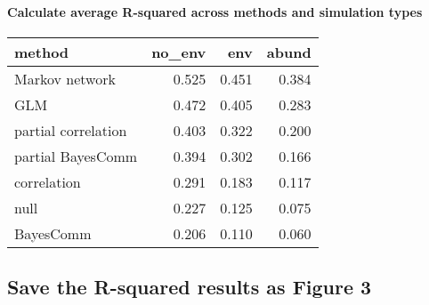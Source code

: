 \documentclass[11pt,]{article}
\newenvironment{Shaded}{\begin{snugshade}}{\end{snugshade}}
\newcommand{\KeywordTok}[1]{\textcolor[rgb]{0.13,0.29,0.53}{\textbf{{#1}}}}
\newcommand{\DataTypeTok}[1]{\textcolor[rgb]{0.13,0.29,0.53}{{#1}}}
\newcommand{\DecValTok}[1]{\textcolor[rgb]{0.00,0.00,0.81}{{#1}}}
\newcommand{\StringTok}[1]{\textcolor[rgb]{0.31,0.60,0.02}{{#1}}}
\newcommand{\NormalTok}[1]{{#1}}
\let\oldparagraph\paragraph
\renewcommand{\paragraph}[1]{\oldparagraph{#1}\mbox{}}
\begin{document}
\paragraph{Calculate average R-squared across methods and simulation
types}\label{calculate-average-r-squared-across-methods-and-simulation-types}

\begin{Shaded}
\end{Shaded}

\begin{longtable}[c]{@{}lrrr@{}}
\toprule
method & no\_env & env & abund\tabularnewline
\midrule
\endhead
Markov network & 0.525 & 0.451 & 0.384\tabularnewline
GLM & 0.472 & 0.405 & 0.283\tabularnewline
partial correlation & 0.403 & 0.322 & 0.200\tabularnewline
partial BayesComm & 0.394 & 0.302 & 0.166\tabularnewline
correlation & 0.291 & 0.183 & 0.117\tabularnewline
null & 0.227 & 0.125 & 0.075\tabularnewline
BayesComm & 0.206 & 0.110 & 0.060\tabularnewline
\bottomrule
\end{longtable}

\subsection{Save the R-squared results as Figure
3}\label{save-the-r-squared-results-as-figure-3}
\end{document}
